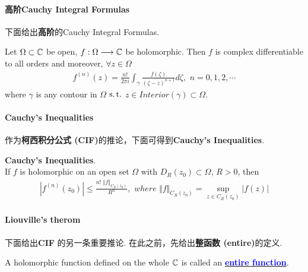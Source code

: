 \paragraph{高阶Cauchy Integral Formulas}
下面给出\textbf{高阶}的Cauchy Integral Formulas.
\begin{thm}\label{thm 5.2.2}
	Let $\Omega \subset \mathbb{C}$ be open, $f : \Omega \longrightarrow \mathbb{C}$ be holomorphic. Then $f$ is complex differentiable to all orders and moreover, $\forall z \in \Omega$
	\begin{align}
		f^{(n)}(z) = \frac{n!}{2 \pi i} \int_{\gamma}{\frac{f(\zeta)}{(\zeta - z)^{n + 1}} d\zeta} , \,\, n = 0 , 1 , 2 , \cdots
	\end{align}
	where $\gamma$ is any contour in $\Omega$ $\operatorname{s.t.}$ $z \in Interior(\gamma) \subset \Omega$.
\end{thm}

\vspace{2em}
\paragraph{\textbf{Cauchy's Inequalities}}
作为\textbf{柯西积分公式 (CIF)}的推论，下面可得到\textbf{Cauchy's Inequalities}.
\begin{corollary}\label{cor 5.2.3}
	\textbf{Cauchy's Inequalities}.\\
	If $f$ is holomorphic on an open set $\Omega$ with $D_{R}(z_0) \subset \Omega$, $R > 0$, then
	\begin{align}
		\left| f^{(n)}(z_0) \right| \leq \frac{n! \,\, \Vert f \Vert_{C_{R}(z_0)}}{R^n} , \,\, where \,\, \Vert f \Vert_{C_{R}(z_0)} = \sup_{z \in C_{R}(z_0)}{\left| f(z) \right|}
	\end{align}
\end{corollary}

\vspace{2em}
\paragraph{\textbf{Liouville's therom}}
下面给出\textbf{CIF} 的另一条重要推论. 在此之前，先给出\textbf{整函数 (entire)}的定义.
\begin{defn}\label{def 5.2.1}
	A holomorphic function defined on the whole $\mathbb{C}$ is called an \underline{\textcolor{blue}{\textbf{entire function}}}.
\end{defn}

